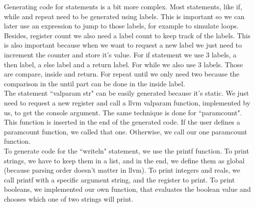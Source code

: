 \documentclass[12pt]{article}
\begin{document}
Generating code for statements is a bit more complex. Most statements, like if, while and repeat need to be generated using labels. This is important so we can later use an expression to jump to those labels, for example to simulate loops. \\ 
Besides, register count we also need a label count to keep track of the labels. This is also important because when we want to request a new label we just need to increment the counter and store it's value. For if statement we use 3 labels, a then label, a else label and a return label. For while we also use 3 labels. Those are compare, inside and return. For repeat until we only need two because the comparison in the until part can be done in the inside label. \\
The statement ``valparam str" can be easily generated because it's static. We just need to request a new register and call a llvm valparam function, implemented by us, to get the console argument. The same technique is done for ``paramcount". This function is inserted in the end of the generated code. If the user defines a paramcount function, we called that one. Otherwise, we call our one paramcount function.\\
To generate code for the ``writeln" statement, we use the printf function. To print strings, we have to keep them in a list, and in the end, we define them as global (because parsing order doesn't matter in llvm). To print integers and reals, we call printf with a specific argument string, and the register to print. To print booleans, we implemented our own function, that evaluates the boolean value and chooses which one of two strings will print. \\
\end{document}
